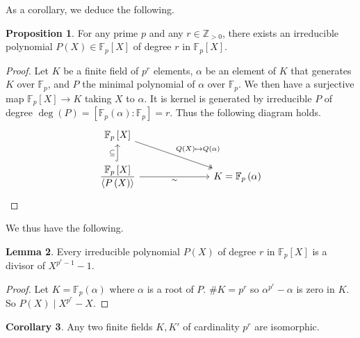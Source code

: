 \documentclass{article}
\newcommand{\F}{\mathbb{F}}
\newcommand{\Z}{\mathbb{Z}}
\newcommand{\rb}[1]{\left( #1 \right)}
\renewcommand{\sb}[1]{\left[ #1 \right]}
\newcommand{\ab}[1]{\left\langle #1 \right\rangle}
\theoremstyle{definition}\newtheorem{definition}{Definition}[subsection]
\theoremstyle{definition}\newtheorem{remark}[definition]{Remark}
\theoremstyle{definition}\newtheorem*{example}{Example}
\theoremstyle{definition}\newtheorem*{note}{Note}
\newtheorem{proposition}[definition]{Proposition}
\newtheorem{lemma}[definition]{Lemma}
\newtheorem{corollary}[definition]{Corollary}
\begin{document}
As a corollary, we deduce the following.

\begin{proposition}
For any prime $ p $ and any $ r \in \Z_{> 0} $, there exists an irreducible polynomial $ P\rb{X} \in \F_p\sb{X} $ of degree $ r $ in $ \F_p\sb{X} $.
\end{proposition}

\begin{proof}
Let $ K $ be a finite field of $ p^r $ elements, $ \alpha $ be an element of $ K $ that generates $ K $ over $ \F_p $, and $ P $ the minimal polynomial of $ \alpha $ over $ \F_p $. We then have a surjective map $ \F_p\sb{X} \to K $ taking $ X $ to $ \alpha $. It is kernel is generated by irreducible $ P $ of degree $ \deg\rb{P} = \sb{\F_p\rb{\alpha} : \F_p} = r $. Thus the following diagram holds.
$$
\begin{tikzcd}[column sep=1in]
\F_p\sb{X} \arrow[twoheadrightarrow]{dr}{Q\rb{X} \mapsto Q\rb{\alpha}} & \\
\dfrac{\F_p\sb{X}}{\ab{P\rb{X}}} \arrow[hookrightarrow]{u}{\subseteq} \arrow[swap]{r}{\sim} & K = \F_p\rb{\alpha}
\end{tikzcd}
$$
\end{proof}

We thus have the following.

\begin{lemma}
Every irreducible polynomial $ P\rb{X} $ of degree $ r $ in $ \F_p\sb{X} $ is a divisor of $ X^{p^r - 1} - 1 $.
\end{lemma}

\begin{proof}
Let $ K = \F_p\rb{\alpha} $ where $ \alpha $ is a root of $ P $. $ \#K = p^r $ so $ \alpha^{p^r} - \alpha $ is zero in $ K $. So $ P\rb{X} \mid X^{p^r} - X $.
\end{proof}

\begin{corollary}
Any two finite fields $ K, K' $ of cardinality $ p^r $ are isomorphic.
\end{corollary}
\end{document}
